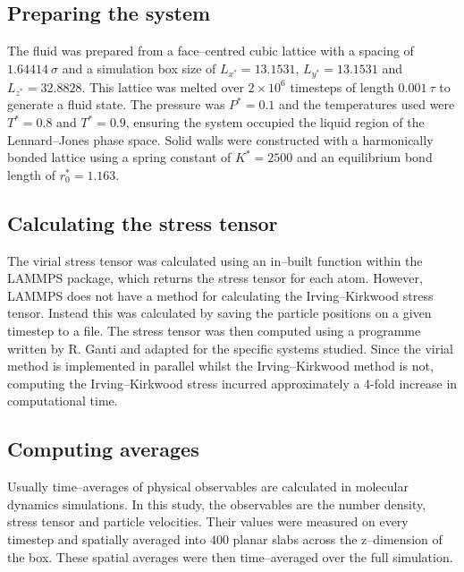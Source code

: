 \subsection{Preparing the system}\label{SystemPrep}
The fluid was prepared from a face--centred cubic lattice with a spacing of $1.64414\ \sigma$ and a simulation box size of $L_{x^{*}}=13.1531$, $L_{y^{*}}=13.1531$ and $L_{z^{*}}=32.8828$.
This lattice was melted over $2\times 10^{6}$ timesteps of length $0.001\ \tau$ to generate a fluid state.
The pressure was $P^{*} = 0.1$ and the temperatures used were $T^{*} = 0.8$ and $T^{*} = 0.9$, ensuring the system occupied the liquid region of the Lennard--Jones phase space.\cite{Smit}
Solid walls were constructed with a harmonically bonded lattice using a spring constant of $K^{*} = 2500$ and an equilibrium bond length of $r^{*}_{0}=1.163$.

\subsection{Calculating the stress tensor}\label{CalcStress}
The virial stress tensor was calculated using an in--built function within the LAMMPS package, which returns the stress tensor for each atom.
However, LAMMPS does not have a method for calculating the Irving--Kirkwood stress tensor.
Instead this was calculated by saving the particle positions on a given timestep to a file.
The stress tensor was then computed using a programme written by R. Ganti and adapted for the specific systems studied.
Since the virial method is implemented in parallel whilst the Irving--Kirkwood method is not, computing the Irving--Kirkwood stress incurred approximately a 4-fold increase in computational time.

\subsection{Computing averages}\label{ComputeAve}
Usually time--averages of physical observables are calculated in molecular dynamics simulations. 
In this study, the observables are the number density, stress tensor and particle velocities.
Their values were measured on every timestep and spatially averaged into $400$ planar slabs across the z--dimension of the box.
These spatial averages were then time--averaged over the full simulation.

